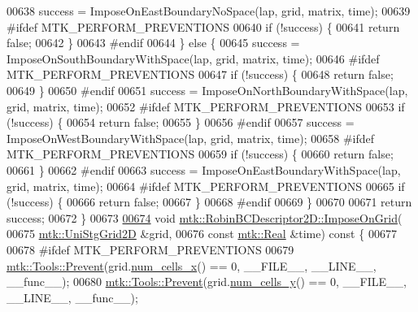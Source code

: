 \begin{DoxyCode}
00638     success = ImposeOnEastBoundaryNoSpace(lap, grid, matrix, time);
00639 \textcolor{preprocessor}{    #ifdef MTK\_PERFORM\_PREVENTIONS}
00640     \textcolor{keywordflow}{if} (!success) \{
00641       \textcolor{keywordflow}{return} \textcolor{keyword}{false};
00642     \}
00643 \textcolor{preprocessor}{    #endif}
00644   \} \textcolor{keywordflow}{else} \{
00645     success = ImposeOnSouthBoundaryWithSpace(lap, grid, matrix, time);
00646 \textcolor{preprocessor}{    #ifdef MTK\_PERFORM\_PREVENTIONS}
00647     \textcolor{keywordflow}{if} (!success) \{
00648       \textcolor{keywordflow}{return} \textcolor{keyword}{false};
00649     \}
00650 \textcolor{preprocessor}{    #endif}
00651     success = ImposeOnNorthBoundaryWithSpace(lap, grid, matrix, time);
00652 \textcolor{preprocessor}{    #ifdef MTK\_PERFORM\_PREVENTIONS}
00653     \textcolor{keywordflow}{if} (!success) \{
00654       \textcolor{keywordflow}{return} \textcolor{keyword}{false};
00655     \}
00656 \textcolor{preprocessor}{    #endif}
00657     success = ImposeOnWestBoundaryWithSpace(lap, grid, matrix, time);
00658 \textcolor{preprocessor}{    #ifdef MTK\_PERFORM\_PREVENTIONS}
00659     \textcolor{keywordflow}{if} (!success) \{
00660       \textcolor{keywordflow}{return} \textcolor{keyword}{false};
00661     \}
00662 \textcolor{preprocessor}{    #endif}
00663     success = ImposeOnEastBoundaryWithSpace(lap, grid, matrix, time);
00664 \textcolor{preprocessor}{    #ifdef MTK\_PERFORM\_PREVENTIONS}
00665     \textcolor{keywordflow}{if} (!success) \{
00666       \textcolor{keywordflow}{return} \textcolor{keyword}{false};
00667     \}
00668 \textcolor{preprocessor}{    #endif}
00669   \}
00670 
00671   \textcolor{keywordflow}{return} success;
00672 \}
00673 
\hypertarget{mtk__robin__bc__descriptor__2d_8cc_source_l00674}{}\hyperlink{classmtk_1_1RobinBCDescriptor2D_ac9564bc46c196cbf4720a0e4b93da8b0}{00674} \textcolor{keywordtype}{void} \hyperlink{classmtk_1_1RobinBCDescriptor2D_ac9564bc46c196cbf4720a0e4b93da8b0}{mtk::RobinBCDescriptor2D::ImposeOnGrid}(
00675     \hyperlink{classmtk_1_1UniStgGrid2D}{mtk::UniStgGrid2D} &grid,
00676     \textcolor{keyword}{const} \hyperlink{group__c01-roots_gac080bbbf5cbb5502c9f00405f894857d}{mtk::Real} &time)\textcolor{keyword}{ const }\{
00677 
00678 \textcolor{preprocessor}{  #ifdef MTK\_PERFORM\_PREVENTIONS}
00679   \hyperlink{classmtk_1_1Tools_a332324c6f25e66be9dff48c5987a3b9f}{mtk::Tools::Prevent}(grid.\hyperlink{classmtk_1_1UniStgGrid2D_a2d182866a398aba8e4829590e85bf939}{num\_cells\_x}() == 0, \_\_FILE\_\_, \_\_LINE\_\_, \_\_func\_\_);
00680   \hyperlink{classmtk_1_1Tools_a332324c6f25e66be9dff48c5987a3b9f}{mtk::Tools::Prevent}(grid.\hyperlink{classmtk_1_1UniStgGrid2D_aed05a801cc9a76dba0ff203cea58a61a}{num\_cells\_y}() == 0, \_\_FILE\_\_, \_\_LINE\_\_, \_\_func\_\_);

\end{DoxyCode}
